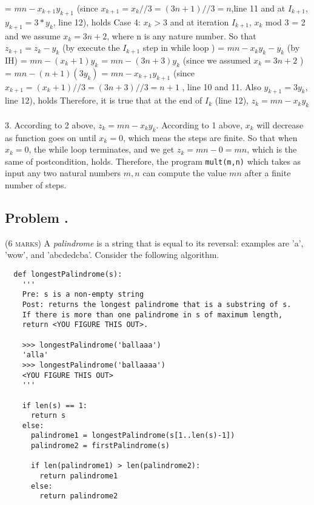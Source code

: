 \documentclass[12pt]{article}
\newcounter{ProblemNum}
\renewcommand{\theProblemNum}{\arabic{ProblemNum}}
\newcommand*{\anyproblem}[1]{\newpage\subsection*{#1}}
\newcommand*{\problem}[1]{\stepcounter{ProblemNum} %
\anyproblem{Problem \theProblemNum. \; #1}}
\begin{document}
\qquad \qquad \qquad = $mn - x_{k+1}y_{k+1}$ (since $x_{k+1} = x_{k} // 3 = (3n+1) //3 = n$,line 11 and at $I_{k+1}$, $y_{k+1} = 3*y_k$, line 12), holds\vskip5pt
Case 4: $ x_k > 3$ and at iteration $I_{k+1}$, $x_k$ mod 3 = 2 and we assume $x_k = 3n+2 $, where n is any nature number. \vskip5pt
So that $z_{k+1} = z_k - y_k$  (by execute the $I_{k+1}$ step in while loop )\vskip5pt
\qquad \qquad \qquad = $mn - x_ky_k - y_k$ (by IH)\vskip5pt
\qquad \qquad \qquad = $mn - (x_k +1)y_k$ \vskip5pt
\qquad \qquad \qquad = $mn - (3n+3)y_k$ (since we assumed $x_k = 3n+2$ )\vskip5pt
\qquad \qquad \qquad = $mn - (n+1)(3y_k)$\vskip5pt
\qquad \qquad \qquad = $mn - x_{k+1}y_{k+1}$ (since $x_{k+1} = (x_k+1)//3 = (3n+3)//3 = n+1$ , line 10 and 11. Also $y_{k+1} = 3y_{k}$, line 12), holds\vskip5pt
Therefore, it is true that at the end of $I_k$ (line 12), $z_k = mn-x_ky_k$ \\[2ex]
\\[2ex]
3. According to 2 above, $z_k = mn-x_ky_k$. \vskip5pt
According to 1 above, $x_k$ will decrease as function goes on until $x_k = 0$, which meas the steps are finite. \vskip5pt
So that when $x_k = 0$, the while loop terminates, and we get  $z_k = mn - 0 = mn$, which is the same of postcondition, holds. \vskip5pt
Therefore, the program \verb|mult(m,n)| which takes as input any two natural numbers $m,n$ can compute the value $mn$ after a finite number of steps.


\problem{}
\textsc{(6 marks)} 
 A \emph{palindrome} is a string that is equal to its reversal: examples are 'a', 'wow', and 'abcdedcba'. Consider the following algorithm.
  
  \begin{small}
  \begin{verbatim}
  def longestPalindrome(s):
    ''' 
    Pre: s is a non-empty string
    Post: returns the longest palindrome that is a substring of s.
    If there is more than one palindrome in s of maximum length, 
    return <YOU FIGURE THIS OUT>.
 
    >>> longestPalindrome('ballaaa')
    'alla'
    >>> longestPalindrome('ballaaaa')
    <YOU FIGURE THIS OUT>
    '''
    
    if len(s) == 1:
      return s
    else:
      palindrome1 = longestPalindrome(s[1..len(s)-1])
      palindrome2 = firstPalindrome(s)
      
      if len(palindrome1) > len(palindrome2):
        return palindrome1
      else:
        return palindrome2
  \end{verbatim}
  \end{small}
  
\end{document}
